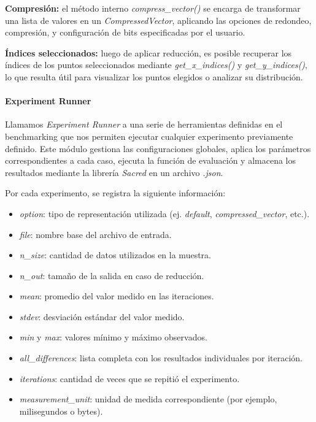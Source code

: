 \vspace{0.5em}
\textbf{Compresión:} el método interno \textit{compress\_vector()} se encarga de transformar una lista de valores en un \textit{CompressedVector}, aplicando las opciones de redondeo, compresión, y configuración de bits especificadas por el usuario.

\vspace{0.5em}
\textbf{Índices seleccionados:} luego de aplicar reducción, es posible recuperar los índices de los puntos seleccionados mediante \textit{get\_x\_indices()} y \textit{get\_y\_indices()}, lo que resulta útil para visualizar los puntos elegidos o analizar su distribución.

\paragraph{Experiment Runner}
\vspace{0.5em}

Llamamos \textit{Experiment Runner} a una serie de herramientas definidas en el benchmarking que nos permiten ejecutar cualquier experimento previamente definido. Este módulo gestiona las configuraciones globales, aplica los parámetros correspondientes a cada caso, ejecuta la función de evaluación y almacena los resultados mediante la librería \textit{Sacred} en un archivo \textit{.json}.

Por cada experimento, se registra la siguiente información:

\begin{itemize}
    \item \textit{option}: tipo de representación utilizada (ej. \textit{default}, \textit{compressed\_vector}, etc.).
    \item \textit{file}: nombre base del archivo de entrada.
    \item \textit{n\_size}: cantidad de datos utilizados en la muestra.
    \item \textit{n\_out}: tamaño de la salida en caso de reducción.
    \item \textit{mean}: promedio del valor medido en las iteraciones.
    \item \textit{stdev}: desviación estándar del valor medido.
    \item \textit{min} y \textit{max}: valores mínimo y máximo observados.
    \item \textit{all\_differences}: lista completa con los resultados individuales por iteración.
    \item \textit{iterations}: cantidad de veces que se repitió el experimento.
    \item \textit{measurement\_unit}: unidad de medida correspondiente (por ejemplo, milisegundos o bytes).
\end{itemize}

